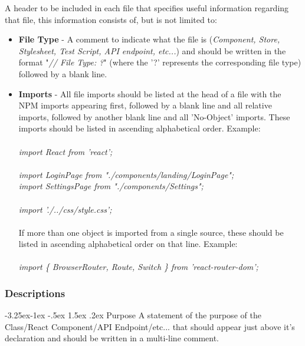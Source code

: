 \documentclass[12pt]{report}
\makeatletter
\renewcommand\paragraph{\@startsection{paragraph}{4}{\z@}%
   {-3.25ex\@plus -1ex \@minus -.5ex}%
   {1.5ex \@plus .2ex}%
   {\large\bfseries}}
\makeatother
\begin{document}
A header to be included in each file that specifies useful information regarding that file, this information consists of, but is not limited to:

\begin{itemize}[noitemsep]
	\item \textbf{File Type} - A comment to indicate what the file is (\textit{Component, Store, Stylesheet, Test Script, API endpoint, etc...}) and should be written in the format "\textit{// File Type: ?}" (where the '?' represents the corresponding file type) followed by a blank line.

	\item \textbf{Imports} - All file imports should be listed at the head of a file with the NPM imports appearing first, followed by a blank line and all relative imports, followed by another blank line and all 'No-Object' imports. These imports should be listed in ascending alphabetical order. Example: \\
    \\
    \textit{import React from 'react';}\\
    \\
    \textit{import LoginPage from "./components/landing/LoginPage";\\
    import SettingsPage from "./components/Settings";}\\
    \\
    \textit{import './../css/style.css';}\\
    \\
    If more than one object is imported from a single source, these should be listed in ascending alphabetical order on that line. Example:\\
    \\
    \textit{import \{ BrowserRouter, Route, Switch \} from 'react-router-dom';}
\end{itemize}

\pagebreak
\subsubsection{Descriptions}

\paragraph{Purpose}
A statement of the purpose of the Class/React Component/API Endpoint/etc... that should appear just above it's declaration and should be written in a multi-line comment.
\end{document}

